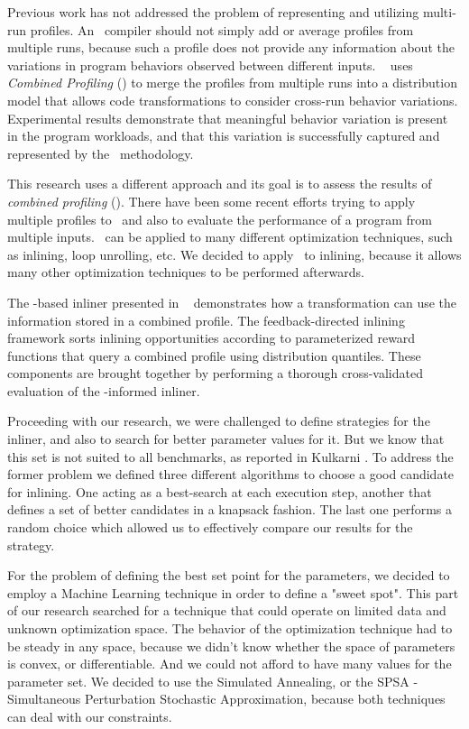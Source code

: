 Previous work has not addressed the problem of representing and
utilizing multi-run profiles.  An \FDO\ compiler should not simply add
or average profiles from multiple runs, because such a profile does
not provide any information about the variations in program behaviors
observed between different inputs. ~\cite{BerubePhD} uses {\it
Combined Profiling} (\CP) to merge the profiles from multiple runs
into a distribution model that allows code transformations to consider
cross-run behavior variations.  Experimental results demonstrate that
meaningful behavior variation is present in the program workloads,
and that this variation is successfully captured and represented by
the \CP\ methodology.


This research uses a different approach and its goal is to assess the results
of {\em combined profiling} (\CP). There have been some recent efforts trying
to apply multiple profiles to \FDO\, and also to evaluate the performance of a
program from multiple inputs. \CP\ can be applied to many different optimization
techniques, such as inlining, loop unrolling, etc. We decided to apply \CP\ to
inlining, because it allows many other optimization techniques to be performed
afterwards.


The \FDO-based inliner presented in ~\cite{BerubePhD}
demonstrates how a transformation can use the information stored in a
combined profile. The feedback-directed inlining framework sorts
inlining opportunities according to parameterized reward functions that
query a combined profile using distribution
quantiles.  These components are brought together by
performing a thorough cross-validated evaluation of the \CP-informed
inliner.


Proceeding with our research, we were challenged to define strategies for the
inliner, and also to search for better parameter values for it. But we know that
this set is not suited to all benchmarks, as reported in Kulkarni \etal \cite{KulkarniCGO13}.
To address the former problem we defined three different algorithms to choose a good candidate for inlining.
One acting as a best-search at each execution step, another that defines a set of
better candidates in a knapsack fashion. The last one performs a random choice
which allowed us to effectively compare our results for the strategy.

For the problem of defining the best set point for the parameters, we decided to employ
a Machine Learning technique in order to define a "sweet spot". This part of our research
searched for a technique that could operate on limited data and unknown optimization
space. The behavior of the optimization technique had to be steady in any space, because
we didn't know whether the space of parameters is convex, or differentiable. And we could
not afford to have many values for the parameter set. We decided to use the Simulated
Annealing, or the SPSA - Simultaneous Perturbation Stochastic Approximation, because
both techniques can deal with our constraints.

